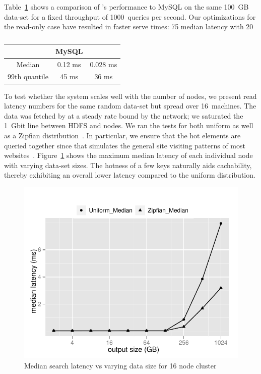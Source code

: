 Table~\ref{mysql:search} shows a comparison of \projectname's
performance to MySQL on the same 100~GB data-set for a fixed
throughput of 1000~queries per second. Our optimizations for the
read-only case have resulted in faster serve times: 75%
median latency with 20%

\begin{table}
\centering
\begin{tabular}{ | c | c | c |  }
\hline
                & MySQL   & \projectname{} \\ \hline
Median          & 0.12 ms & 0.028 ms       \\
99th quantile	& 45 ms   & 36 ms          \\
\hline
\end{tabular}
\caption{}
\label{mysql:search}
\end{table}

To test whether the system scales well with the number of nodes, we
present read latency numbers for the same random data-set but spread
over 16~machines. The data was fetched by \projectname{} at a steady
rate bound by the network; we saturated the 1~Gbit line between HDFS
and \projectname{} nodes. We ran the tests for both uniform as well as
a Zipfian distribution~\cite{gray}. In particular, we ensure that the
hot elements are queried together since that simulates the general
site visiting patterns of most websites~\cite{...}.
Figure~\ref{16search} shows the maximum median latency of each
individual node with varying data-set sizes. The hotness of a few keys
naturally aids cachability, thereby exhibiting an overall lower
latency compared to the uniform distribution. 

\begin{figure}
  \centering
    \includegraphics[scale=0.55]{images/search_16node.pdf}
  \caption{Median search latency vs varying data size for 16 node cluster}
  \label{16search}
\end{figure}

